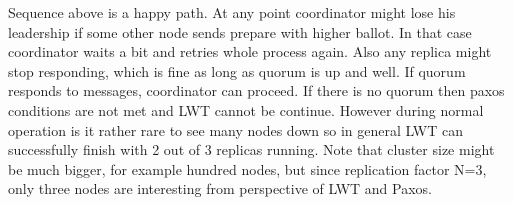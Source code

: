 Sequence above is a happy path. At any point coordinator might lose his leadership if some other node sends prepare with higher ballot. In that case coordinator waits a bit and retries whole process again. 
Also any replica might stop responding, which is fine as long as quorum is up and well. If quorum responds to messages, coordinator can proceed. If there is no quorum then paxos conditions are not met and LWT cannot be continue. However during normal operation is it rather rare to see many nodes down so in general LWT can successfully finish with 2 out of 3 replicas running. Note that cluster size might be much bigger, for example hundred nodes, but since replication factor N=3, only three nodes are interesting from perspective of LWT and Paxos.


